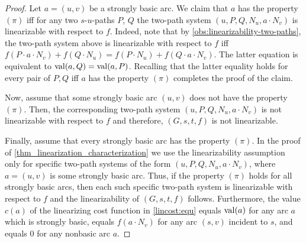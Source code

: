 \begin{proof}
    Let $a = (u, v)$ be a strongly basic arc. We claim that $a$ has the property $(\pi)$ iff for any two  $s$-$u$-paths $P$, $Q$  the two-path system $(u,P,Q,N_u,a \cdot N_v)$ is linearizable with respect to $f$. Indeed, note that by \cref{obs:linearizability-two-paths}, the   two-path system above is linearizable with respect to $f$  iff $f(P \cdot a \cdot N_v) + f(Q \cdot N_u) = f(P \cdot N_u) + f(Q \cdot a \cdot N_v)$. The latter equation is equivalent to $\operatorname{val}(a,Q) = \operatorname{val}(a,P)$. Recalling that  the latter equality  
     holds for every pair of $P, Q$ iff $a$ has the property $(\pi)$ completes the proof of the claim.
    
    Now, assume that some strongly basic arc $(u,v)$ does not have the property $(\pi)$. Then, the corresponding two-path system $(u,P,Q,N_u,a \cdot N_v)$ is not linearizable with respect to $f$ and therefore,  $(G,s,t,f)$ is  not linearizable.
    
    Finally, assume that every strongly basic arc has the property $(\pi)$. 
  In the proof of \cref{thm_linearization_characterization}
    we  use the linearizability assumption   only for  specific two-path systems  of the  form $(u, P, Q, N_u, a \cdot N_v)$,  where   $a = (u, v)$ is some strongly basic arc. Thus,  if the property $(\pi)$ holds for all strongly basic arcs, then  each such specific two-path system is linearizable with respect to $f$ and the linearizability of $(G,s,t,f)$ follows. Furthermore, the value $c(a)$ of the linearizing cost function in \cref{lincost:equ}   equals  $\operatorname{val}(a)$ for  any arc $a$ which is  strongly basic, equals $f(a \cdot N_v)$ for any arc $(s,v)$ incident to $s$, and equals $0$ for any   nonbasic arc $a$. 
     
\end{proof}

